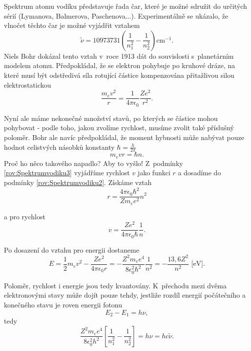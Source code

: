 Spektrum atomu vodíku představuje řada čar, které je možné sdružit do určitých sérií (Lymanova, Balmerova, Paschenova...). Experimentálně se ukázalo, že vlnočet těchto čar je možné vyjádřit vztahem
\begin{equation}
\tilde{\nu} = 10973731\left( \frac{1}{n_1^2} - \frac{1}{n_2^2}\right ) \mathrm{cm} ^{-1}\mbox{.}
\label{rov:Spektrumvodiku1}
\end{equation}
Niels Bohr dokázal tento vztah v~roce 1913 dát do souvislosti s~planetárním modelem atomu. Předpokládal, že se elektron pohybuje po kruhové dráze, na které musí být odstředivá síla rotující částice kompenzována přitažlivou silou elektrostatickou
\begin{equation}
\frac{m_{e}v^2}{r} = \frac{1}{4\pi \epsilon_0}\frac{Ze^2}{r^2}\mbox{.}
\label{rov:Spektrumvodiku2}
\end{equation}

\noindent Nyní ale máme nekonečné množství stavů, po kterých se částice mohou pohybovat - podle toho, jakou zvolíme rychlost, musíme zvolit také příslušný poloměr. Bohr ale navíc předpokládal, že moment hybnosti může nabývat pouze hodnot celistvých násobků konstanty $\hbar=\frac{h}{2\pi}$
\begin{equation}
m_{e}vr = \hbar n \mbox{.}
\label{rov:Spektrumvodiku3}
\end{equation}
\noindent Proč ho něco takového napadlo? Aby to vyšlo! Z~podmínky \ref{rov:Spektrumvodiku3} vyjádříme rychlost $v$ jako funkci $r$ a dosadíme do podmínky \ref{rov:Spektrumvodiku2}. Získáme vztah
\begin{equation}
r = \frac{4\pi\epsilon_0\hbar^2}{Zm_e e^2}n^2
\label{rov:Spektrumvodiku4}
\end{equation}

\noindent a pro rychlost
\begin{equation}
v = \frac{Ze^2}{4\pi\epsilon_0\hbar}\frac{1}{n}\mbox{.}
\label{rov:Spektrumvodiku5}
\end{equation}

\noindent Po dosazení do vztahu pro energii dostaneme
\begin{equation}
\boxed{E = \frac{1}{2}m_e v^2 - \frac{Ze^2}{4\pi\epsilon_0r} = - \frac{Z^2m_e e^4}{8 \epsilon_0^2\hbar^2}\frac{1}{n^2} = -\frac{13,6 Z^2}{n^2} \mbox{ [eV]}\mbox{.}}
\label{Spektrumvodiku6}
\end{equation}

\noindent Poloměr, rychlost i energie jsou tedy kvantovány. K~přechodu mezi dvěma elektronovými stavy může dojít pouze tehdy, jestliže rozdíl energií počátečního a konečného stavu je roven energii fotonu
\begin{equation}
E_2-E_1 = h\nu,
\label{rov:Spektrumvodiku7}
\end{equation}
tedy
\begin{equation}
\frac{Z^2m_e e^4}{8\epsilon_0^2h^2}\left[ \frac{1}{n_1^2} - \frac{1}{n_2^2} \right ] = h\nu = hc\tilde{\nu}.
\label{rov:Spektrumvodiku8}
\end{equation}

